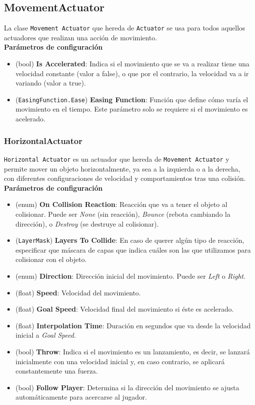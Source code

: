 \subsection{MovementActuator}
La clase \texttt{Movement Actuator} que hereda de \texttt{Actuator} se usa para todos aquellos actuadores que realizan una acción de movimiento. \\

\textbf{Parámetros de configuración}
\begin{itemize}
	\item (bool) \textbf{Is Accelerated}: Indica si el movimiento que se va a realizar tiene una velocidad constante (valor a false), o que por el contrario, la velocidad va a ir variando (valor a true).
	\item (\texttt{EasingFunction.Ease}) \textbf{Easing Function}: Función que define cómo varía el movimiento en el tiempo. Este parámetro solo se requiere si el movimiento es acelerado.
\end{itemize}

\subsubsection{HorizontalActuator}
\texttt{Horizontal Actuator} es un actuador que hereda de \texttt{Movement Actuator} y permite mover un objeto horizontalmente, ya sea a la izquierda o a la derecha, con diferentes configuraciones de velocidad y comportamientos tras una colisión.\\

\textbf{Parámetros de configuración}
\begin{itemize}
	\item (enum) \textbf{On Collision Reaction}: Reacción que va a tener el objeto al colisionar. Puede ser \textit{None} (sin reacción), \textit{Bounce} (rebota cambiando la dirección), o \textit{Destroy} (se destruye al colisionar).
	\item (\texttt{LayerMask}) \textbf{Layers To Collide}: En caso de querer algún tipo de reacción, especificar que máscara de capas que indica cuáles son las que utilizamos para colisionar con el objeto.
	\item (enum) \textbf{Direction}: Dirección inicial del movimiento. Puede ser \textit{Left} o \textit{Right}.
	\item (float) \textbf{Speed}: Velocidad del movimiento.
	\item (float) \textbf{Goal Speed}: Velocidad final del movimiento si éste es acelerado.
	\item (float) \textbf{Interpolation Time}: Duración en segundos que va desde la velocidad inicial a \textit{Goal Speed}.
	\item (bool) \textbf{Throw}: Indica si el movimiento es un lanzamiento, es decir, se lanzará inicialmente con una velocidad inicial y, en caso contrario, se aplicará constantemente una fuerza.
	\item (bool) \textbf{Follow Player}: Determina si la dirección del movimiento se ajusta automáticamente para acercarse al jugador.
\end{itemize}

